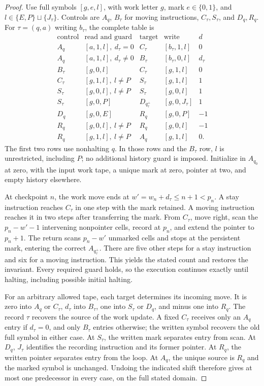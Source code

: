 \begin{proof}\label{ba:split-mark-compiler-proof}
Use full symbols $[g,e,l]$, with work letter $g$, mark $e\in\{0,1\}$,
and $l\in\{E,P\}\sqcup\{J_\tau\}$.  Controls are $A_q$,
$B_\tau$ for moving instructions, $C_\tau,S_\tau$, and $D_q,R_q$.
For $\tau=(q,a)$ writing $b_\tau$, the complete table is
\[
\begin{array}{c|c|c|c|r}
\text{control}&\text{read and guard}&\text{target}&\text{write}&d\\\hline
A_q&[a,1,l],\ d_\tau=0&C_\tau&[b_\tau,1,l]&0\\
A_q&[a,1,l],\ d_\tau\ne0&B_\tau&[b_\tau,0,l]&d_\tau\\
B_\tau&[g,0,l]&C_\tau&[g,1,l]&0\\
C_\tau&[g,1,l],\ l\ne P&S_\tau&[g,1,l]&1\\
S_\tau&[g,0,l],\ l\ne P&S_\tau&[g,0,l]&1\\
S_\tau&[g,0,P]&D_{q^+_\tau}&[g,0,J_\tau]&1\\
D_q&[g,0,E]&R_q&[g,0,P]&-1\\
R_q&[g,0,l],\ l\ne P&R_q&[g,0,l]&-1\\
R_q&[g,1,l],\ l\ne P&A_q&[g,1,l]&0.
\end{array}
\]
The first two rows use nonhalting $q$.  In those rows and the
$B_\tau$ row, $l$ is unrestricted, including $P$; no additional
history guard is imposed.  Initialize in $A_{q_0}$ at zero, with the
input work tape, a unique mark at zero, pointer at two, and empty
history elsewhere.

At checkpoint $n$, the work move ends at
$w'=w_n+d_\tau\le n+1<p_n$.  A stay instruction reaches $C_\tau$
in one step with the mark retained.  A moving instruction reaches it
in two steps after transferring the mark.  From $C_\tau$, move right,
scan the $p_n-w'-1$ intervening nonpointer cells, record at $p_n$,
and extend the pointer to $p_n+1$.  The return scans $p_n-w'$
unmarked cells and stops at the persistent mark, entering the correct
$A_{q^+_\tau}$.  There are five other steps for a stay instruction
and six for a moving instruction.  This yields the stated count and
restores the invariant.  Every required guard holds, so the execution
continues exactly until halting, including possible initial halting.

For an arbitrary allowed tape, each target determines its incoming move.
It is zero into $A_q$ or $C_\tau$, $d_\tau$ into $B_\tau$, one into
$S_\tau$ or $D_q$, and minus one into $R_q$.  The record $\tau$ recovers the
source of the work update.  A fixed $C_\tau$ receives only an $A_q$
entry if $d_\tau=0$, and only $B_\tau$ entries otherwise; the written
symbol recovers the old full symbol in either case.  At $S_\tau$,
the written mark separates entry from scan.  At $D_q$, $J_\tau$
identifies the recording instruction and its former pointer.  At $R_q$,
the written pointer separates entry from the loop.  At $A_q$, the
unique source is $R_q$ and the marked symbol is unchanged.  Undoing
the indicated shift therefore gives at most one predecessor in every
case, on the full stated domain.
\end{proof}

